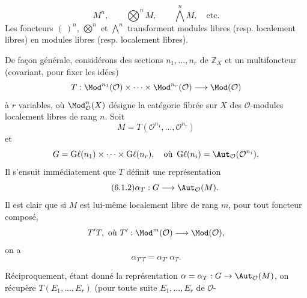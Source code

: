 \begin{equation}\tag{6.1.1}
 M^n,\qquad \bigotimes^n M,\qquad \bigwedge^n M,\quad\text{etc.}
\end{equation}
Les
foncteurs \((\ )^n\), \(\bigotimes\limits^n\) et \(\bigwedge\limits^n\) transforment modules libres (resp. localement libres) en modules libres (resp. localement libres).

De façon générale, considérons des sections \(n_1,\ldots,n_r\) de \(\mathbb Z_X\) et un multifoncteur (covariant, pour fixer les idées)
\[
 T:\Mod^{n_1}(\mathcal O)\times\cdots\times
 \Mod^{n_r}(\mathcal O)\longrightarrow\Mod(\mathcal O)
\]
à \(r\) variables, où \(\Mod_{\mathcal O}^{n}(X)\) désigne la catégorie fibrée sur \(X\) des \(\mathcal O\)-modules localement libres de rang \(n\). Soit
\[
 M=T(\mathcal O^{n_1},\ldots,\mathcal O^{n_r})
\]
et
\[
 G=\operatorname{G\ell}(n_1)\times\cdots\times\operatorname{G\ell}(n_r),
 \quad\text{où }\operatorname{G\ell}(n_i)=\Aut_{\mathcal O}(\mathcal O^{n_i}).
\]
Il s'ensuit immédiatement que \(T\) définit une représentation
\begin{equation}\tag{6.1.2}
 \alpha_T:G\longrightarrow\Aut_{\mathcal O}(M).
\end{equation}
Il est clair que si \(M\) est lui-même localement libre de rang \(m\), pour tout foncteur composé,
\[
 T'T,\ \text{où } T':\Mod^{m}(\mathcal O)\longrightarrow\Mod(\mathcal O),
\]
on a
\begin{equation}\tag{6.1.3}
 \alpha_{T'T}=\alpha_{T'}\,\alpha_T.
\end{equation}

Réciproquement, étant donné la représentation \(\alpha=\alpha_T:G\to\Aut_{\mathcal O}(M)\), on récupère \(T(E_1,\ldots,E_r)\) (pour toute suite \(E_1,\ldots,E_r\) de \(\mathcal O\)-
